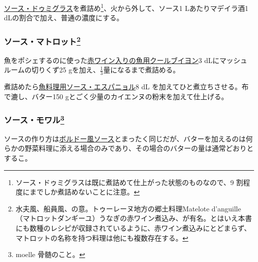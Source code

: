 \begin{recette}


\protect\hyperlink{sauce-demi-glace}{ソース・ドゥミグラス}を煮詰め\footnote{ソース・ドゥミグラスは既に煮詰めて仕上がった状態のものなので、9
  割程度にまでしか煮詰めないことに注意。}、火から外して、ソース1
Lあたりマデイラ酒1 dLの割合で加え、普通の濃度にする。

\hypertarget{sauce-matelote}{%
\subsubsection[ソース・マトロット]{\texorpdfstring{ソース・マトロット\footnote{水夫風、船員風、の意。トゥーレーヌ地方の郷土料理Matelote
  d'anguille（マトロットダンギーユ）うなぎの赤ワイン煮込み、が有名。とはいえ本書にも数種のレシピが収録されているように、赤ワイン煮込みにとどまらず、マトロットの名称を持つ料理は他にも複数存在する。}}{ソース・マトロット}}\label{sauce-matelote}}



魚をポシェするのに使った\protect\hyperlink{court-bouillon-c}{赤ワイン入りの魚用クールブイヨン}3
dLにマッシュルームの切りくず25
gを加え、\(\frac{1}{3}\)量になるまで煮詰める。

煮詰めたら\protect\hyperlink{sauce-espagnole-maigre}{魚料理用ソース・エスパニョル}8
dL を加えてひと煮立ちさせる。布で漉し、バター150
gとごく少量のカイエンヌの粉末を加えて仕上げる。

\hypertarget{sauce-moelle}{%
\subsubsection[ソース・モワル]{\texorpdfstring{ソース・モワル\footnote{moelle
  骨髄のこと。}}{ソース・モワル}}\label{sauce-moelle}}



ソースの作り方は\protect\hyperlink{sauce-bordelaise}{ボルドー風ソース}とまったく同じだが、バターを加えるのは何らかの野菜料理に添える場合のみであり、その場合のバターの量は通常どおりとするこ。


\end{recette}
